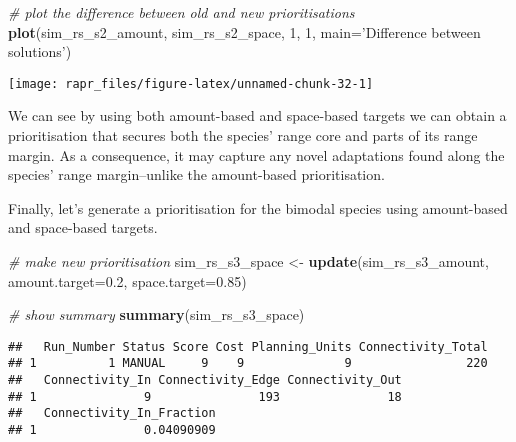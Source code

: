 \documentclass[11pt,]{article}
\newenvironment{Shaded}{\begin{snugshade}}{\end{snugshade}}
\newcommand{\KeywordTok}[1]{\textcolor[rgb]{0.13,0.29,0.53}{\textbf{{#1}}}}
\newcommand{\DataTypeTok}[1]{\textcolor[rgb]{0.13,0.29,0.53}{{#1}}}
\newcommand{\DecValTok}[1]{\textcolor[rgb]{0.00,0.00,0.81}{{#1}}}
\newcommand{\FloatTok}[1]{\textcolor[rgb]{0.00,0.00,0.81}{{#1}}}
\newcommand{\StringTok}[1]{\textcolor[rgb]{0.31,0.60,0.02}{{#1}}}
\newcommand{\CommentTok}[1]{\textcolor[rgb]{0.56,0.35,0.01}{\textit{{#1}}}}
\newcommand{\NormalTok}[1]{{#1}}
\let\origfigure\figure
\let\endorigfigure\endfigure
\renewenvironment{figure}[1][2] {
	\expandafter\origfigure\expandafter[H]
} {
	\endorigfigure
}
\begin{document}
\begin{Shaded}
\begin{Highlighting}[]
\CommentTok{# plot the difference between old and new prioritisations}
\KeywordTok{plot}\NormalTok{(sim_rs_s2_amount, sim_rs_s2_space, }\DecValTok{1}\NormalTok{, }\DecValTok{1}\NormalTok{, }\DataTypeTok{main=}\StringTok{'Difference between solutions'}\NormalTok{)}
\end{Highlighting}
\end{Shaded}

\begin{figure}

{\centering \texttt{[image: rapr\_files/figure-latex/unnamed-chunk-32-1]} 

}

\caption{Difference between two prioritisations for the normally distributed species. See Figure 7 caption for conventions.}\label{fig:unnamed-chunk-32}
\end{figure}

We can see by using both amount-based and space-based targets we can
obtain a prioritisation that secures both the species' range core and
parts of its range margin. As a consequence, it may capture any novel
adaptations found along the species' range margin--unlike the
amount-based prioritisation.

Finally, let's generate a prioritisation for the bimodal species using
amount-based and space-based targets.

\begin{Shaded}
\begin{Highlighting}[]
\CommentTok{# make new prioritisation}
\NormalTok{sim_rs_s3_space <-}\StringTok{ }\KeywordTok{update}\NormalTok{(sim_rs_s3_amount, }\DataTypeTok{amount.target=}\FloatTok{0.2}\NormalTok{, }\DataTypeTok{space.target=}\FloatTok{0.85}\NormalTok{)}
\end{Highlighting}
\end{Shaded}

\begin{Shaded}
\begin{Highlighting}[]
\CommentTok{# show summary}
\KeywordTok{summary}\NormalTok{(sim_rs_s3_space)}
\end{Highlighting}
\end{Shaded}

\begin{verbatim}
##   Run_Number Status Score Cost Planning_Units Connectivity_Total
## 1          1 MANUAL     9    9              9                220
##   Connectivity_In Connectivity_Edge Connectivity_Out
## 1               9               193               18
##   Connectivity_In_Fraction
## 1               0.04090909
\end{verbatim}
\end{document}
